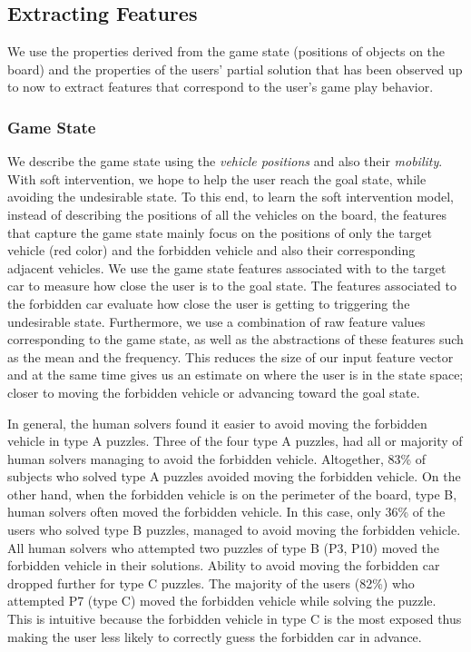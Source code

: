 \subsection*{Extracting Features}
We use the properties derived from the game state (positions of objects on the board) and the properties of the users' partial solution that has been observed up to now to extract features that correspond to the user's game play behavior. 
\subsubsection*{Game State}
We describe the game state using the \textit{vehicle positions} and  also their \textit{mobility}. With soft intervention, we hope to help the user reach the goal state, while avoiding the undesirable state. To this end, to learn the soft intervention model, instead of describing the positions of all the vehicles on the board, the features that capture the game state mainly focus on the positions of only the target vehicle (red color) and the forbidden vehicle and also their corresponding adjacent vehicles. We use the game state features associated with to the target car to measure how close the user is to the goal state. The features associated to the forbidden car evaluate how close the user is getting to triggering the undesirable state. Furthermore, we use a combination of raw feature values corresponding to the game state, as well as the abstractions of these features such as the mean and the frequency. This reduces the size of our input feature vector and at the same time gives us an estimate on where the user is in the state space; closer to moving the forbidden vehicle or advancing toward the goal state.

In general, the human solvers found it easier to avoid moving the forbidden vehicle in type A puzzles. Three of the four type A puzzles, had all or majority of human solvers managing to avoid the forbidden vehicle. Altogether, 83\% of subjects who solved type A puzzles avoided moving the forbidden vehicle. On the other hand, when the forbidden vehicle is on the perimeter of the board, type B, human solvers often moved the forbidden vehicle. In this case, only 36\% of the users who solved type B puzzles, managed to avoid moving the forbidden vehicle. All human solvers who attempted two puzzles of type B (P3, P10) moved the forbidden vehicle in their solutions. Ability to avoid moving the forbidden car dropped further for type C puzzles. The majority of the users (82\%) who attempted P7 (type C) moved the forbidden vehicle while solving the puzzle. This is intuitive because the forbidden vehicle in type C is the most exposed thus making the user less likely to correctly guess the forbidden car in advance.

